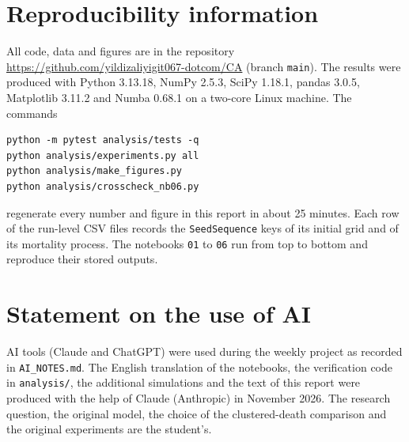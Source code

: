 \documentclass[11pt,a4paper]{article}
\begin{document}
\section*{Reproducibility information}

All code, data and figures are in the repository \url{https://github.com/yildizaliyigit067-dotcom/CA} (branch \texttt{main}). The results were produced with Python 3.13.18, NumPy 2.5.3, SciPy 1.18.1, pandas 3.0.5, Matplotlib 3.11.2 and Numba 0.68.1 on a two-core Linux machine. The commands
\begin{verbatim}
python -m pytest analysis/tests -q
python analysis/experiments.py all
python analysis/make_figures.py
python analysis/crosscheck_nb06.py
\end{verbatim}
regenerate every number and figure in this report in about 25 minutes. Each row of the run-level CSV files records the \texttt{SeedSequence} keys of its initial grid and of its mortality process. The notebooks \texttt{01} to \texttt{06} run from top to bottom and reproduce their stored outputs.

\section*{Statement on the use of AI}

AI tools (Claude and ChatGPT) were used during the weekly project as recorded in \texttt{AI\_NOTES.md}. The English translation of the notebooks, the verification code in \texttt{analysis/}, the additional simulations and the text of this report were produced with the help of Claude (Anthropic) in November 2026. The research question, the original model, the choice of the clustered-death comparison and the original experiments are the student's.
\end{document}
